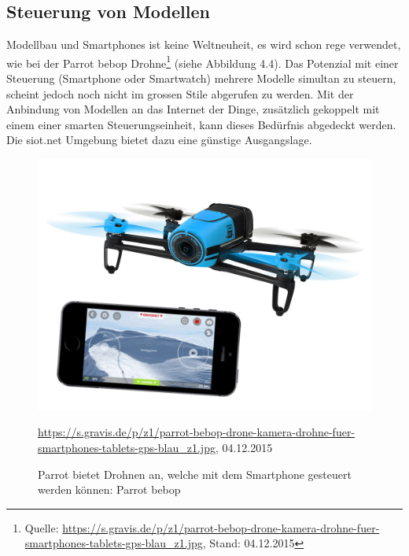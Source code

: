 \subsection{Steuerung von Modellen}
Modellbau und Smartphones ist keine Weltneuheit, es wird schon rege verwendet, wie bei der Parrot bebop Drohne\footnote{Quelle: \url{https://s.gravis.de/p/z1/parrot-bebop-drone-kamera-drohne-fuer-smartphones-tablets-gps-blau_z1.jpg}, Stand: 04.12.2015 } (siehe Abbildung 4.4). Das Potenzial mit einer Steuerung (Smartphone oder Smartwatch) mehrere Modelle simultan zu steuern, scheint jedoch noch nicht im grossen Stile abgerufen zu werden.
Mit der Anbindung von Modellen an das Internet der Dinge, zusätzlich gekoppelt mit einem einer smarten Steuerungseinheit, kann dieses Bedürfnis abgedeckt werden. Die siot.net Umgebung bietet dazu eine günstige Ausgangslage.
\begin{figure}[h]
  \centering
  \includegraphics[scale=1]{98_Bilder/04_Anwendungen/parrotdrone}
  \caption[Smartphone gesteuerte Drohne: Parrot bebop]{Parrot bietet Drohnen an, welche mit dem Smartphone gesteuert werden können: Parrot bebop}
  \footnotesize \url{https://s.gravis.de/p/z1/parrot-bebop-drone-kamera-drohne-fuer-smartphones-tablets-gps-blau_z1.jpg}, 04.12.2015
\end{figure}

